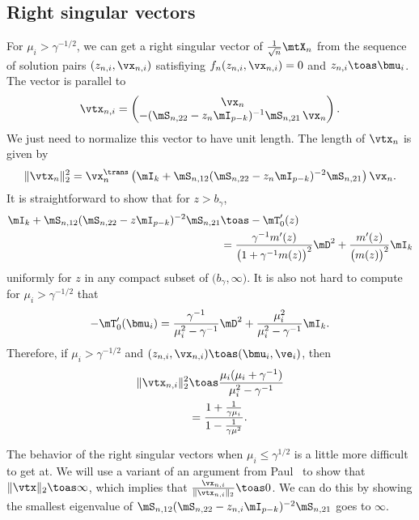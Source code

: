\subsection{Right singular vectors}

For $\mu_i > \gamma^{-1/2}$, we can get a right singular vector of $\frac{1}{\sqrt{n}} \mtX_n$ from the sequence of solution pairs 
$(z_{n,i}, \vx_{n,i})$ satisfiying 
$f_n(z_{n,i}, \vx_{n,i}) = 0$ and $z_{n,i} \toas \bmu_i$.  The vector
is parallel to
\[
    \vtx_{n,i}
    =
    \left(
    \begin{matrix}
        \vx_n \\
        - ( \mS_{n,22} - z_n \mI_{p-k} )^{-1} \mS_{n,21} \, \vx_n
    \end{matrix}
    \right).
\]
We just need to normalize this vector to have unit length.  The length
of $\vtx_n$ is given by
\[
    \| \vtx_n \|_2^2
        =
        \vx_n^\trans
        \left(
            \mI_{k}
            +
            \mS_{n,12}
            ( \mS_{n,22} - z_n \mI_{p-k} )^{-2} 
            \mS_{n,21}
        \right)
        \vx_n.
\]
It is straightforward to show that for $z > b_\gamma$,
\begin{align*}
    \mI_{k}
    +
    \mS_{n,12}
    ( \mS_{n,22} - z \mI_{p-k} )^{-2} 
    \mS_{n,21}
        &\toas
            -\mT_0'(z) \\
        &= \frac{ \gamma^{-1} m'(z) }
                { \big( 1 + \gamma^{-1} m(z) \big)^2 }
           \mD^2
           +
           \frac{ m'(z) }{ \big( m(z) \big)^2 }
           \mI_k
\end{align*}
uniformly for $z$ in any compact subset of $\big( b_\gamma, \infty \big)$.
It is also not hard to compute for $\mu_i > \gamma^{-1/2}$ that
\[
    -\mT_0'( \bmu_i )
        =
            \frac{ \gamma^{-1} }{ \mu_i^2 - \gamma^{-1} }
            \mD^2
            +
            \frac{ \mu_i^2 }{ \mu_i^2 - \gamma^{-1} }
            \mI_k.
\]
Therefore, if $\mu_i > \gamma^{-1/2}$ and 
$(z_{n,i}, \vx_{n,i}) \toas (\bmu_i, \ve_i)$, then
\begin{align*}
    \| \vtx_{n,i} \|_2^2
        &\toas
            \frac{ \mu_i ( \mu_i + \gamma^{-1} ) }
                 { \mu_i^2 - \gamma^{-1} } \\
        &=
            \frac{ 1 + \tfrac{1}{ \gamma \mu_i} }
                 { 1 - \tfrac{1}{ \gamma \mu^2} }.
\end{align*}

The behavior of the right singular vectors when $\mu_i \leq \gamma^{1/2}$ is
a little more difficult to get at.  We will use a variant of an argument from Paul~\cite{paul2007ase} to show that $\| \vtx \|_2 \toas \infty$, which implies that $\frac{ \vx_{n,i} }{ \| \vtx_{n,i} \|_2 } \toas 0$.  We can
do this by showing the smallest eigenvalue of 
\(
    \mS_{n,12}
    ( \mS_{n,22} - z_{n,i} \mI_{p-k} )^{-2} 
    \mS_{n,21}
\)
goes to $\infty$.

